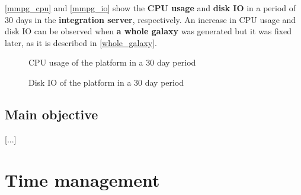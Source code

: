 \documentclass[a4paper,11pt,titlepage,abstract,numbers=noenddot,automark,mnsy,intlimits,rgb,dvipsnames]{report}
\begin{document}
\autoref{mmpg_cpu} and \autoref{mmpg_io} show the \textbf{CPU usage} and \textbf{disk IO} in a period of 30 days in
the \textbf{integration server}, respectively. An increase in CPU usage and disk IO
can be observed when \textbf{a whole galaxy} was generated but it was fixed later, as it is described in \autoref{whole_galaxy}.
\begin{figure}[H]
\noindent{}
\caption{CPU usage of the platform in a 30 day period}
\label{mmpg_cpu}
\end{figure}
\begin{figure}[H]
\noindent{}
\caption{Disk IO of the platform in a 30 day period}
\label{mmpg_io}
\end{figure}
\section{Main objective}
[...]
\chapter{Time management}
\end{document}
